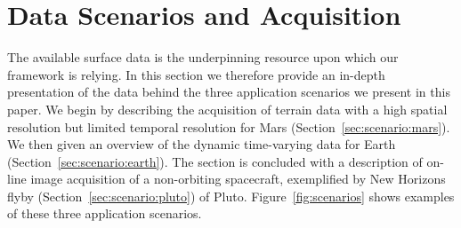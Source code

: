 \documentclass[journal]{vgtc}                %
\newcommand{\fig}[1]{Figure~\ref{fig:#1}}
\begin{document}



\section{Data Scenarios and Acquisition} \label{sec:scenarios}
The available surface data is the underpinning resource upon which our framework is relying. In this section we therefore provide an in-depth presentation of the data behind the three application scenarios we present in this paper.
We begin by describing the acquisition of terrain data with a high spatial resolution but limited temporal resolution for Mars (Section~\ref{sec:scenario:mars}). We then given an overview of the dynamic time-varying data for Earth (Section~\ref{sec:scenario:earth}). The section is concluded with a description of on-line image acquisition of a non-orbiting spacecraft, exemplified by New Horizons flyby (Section~\ref{sec:scenario:pluto}) of Pluto.
\fig{scenarios} shows examples of these three application scenarios.

\end{document}
